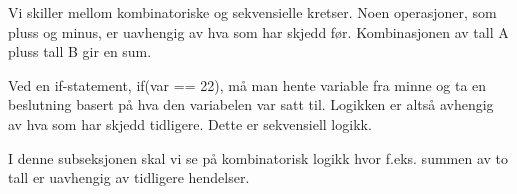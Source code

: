 Vi skiller mellom kombinatoriske og sekvensielle kretser.
Noen operasjoner, som pluss og minus, er uavhengig av hva som har skjedd før.
Kombinasjonen av tall A pluss tall B gir en sum.

Ved en if-statement, if(var == 22), må man hente variable fra minne og ta en
beslutning basert på hva den variabelen var satt til.
Logikken er altså avhengig av hva som har skjedd tidligere.
Dette er sekvensiell logikk.

I denne subseksjonen skal vi se på kombinatorisk logikk hvor f.eks. summen
av to tall er uavhengig av tidligere hendelser.
